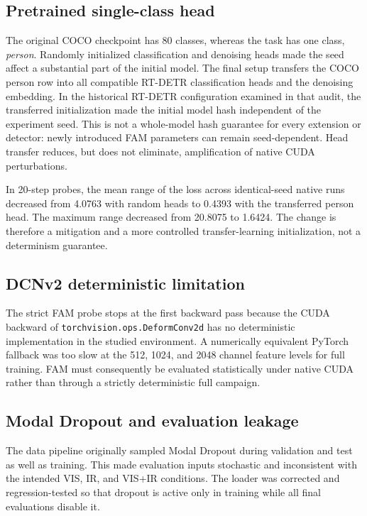 \subsection{Pretrained single-class head}

The original COCO checkpoint has 80 classes, whereas the task has one class,
\emph{person}. Randomly initialized classification and denoising heads made the
seed affect a substantial part of the initial model. The final setup transfers
the COCO person row into all compatible RT-DETR classification heads and the
denoising embedding. In the historical RT-DETR configuration examined in that
audit, the transferred initialization made the initial model hash independent
of the experiment seed. This is not a whole-model hash guarantee for every
extension or detector: newly introduced FAM parameters can remain
seed-dependent. Head transfer reduces, but does not eliminate, amplification
of native CUDA perturbations.

In 20-step probes, the mean range of the loss across identical-seed native
runs decreased from 4.0763 with random heads to 0.4393 with the transferred
person head. The maximum range decreased from 20.8075 to 1.6424. The change is
therefore a mitigation and a more controlled transfer-learning initialization,
not a determinism guarantee.

\subsection{DCNv2 deterministic limitation}

The strict FAM probe stops at the first backward pass because the CUDA backward
of \texttt{torchvision.ops.DeformConv2d} has no deterministic implementation in
the studied environment. A numerically equivalent PyTorch fallback was too
slow at the 512, 1024, and 2048 channel feature levels for full training. FAM
must consequently be evaluated statistically under native CUDA rather than
through a strictly deterministic full campaign.

\subsection{Modal Dropout and evaluation leakage}

The data pipeline originally sampled Modal Dropout during validation and test
as well as training. This made evaluation inputs stochastic and inconsistent
with the intended VIS, IR, and VIS+IR conditions. The loader was corrected and
regression-tested so that dropout is active only in training while all final
evaluations disable it.

